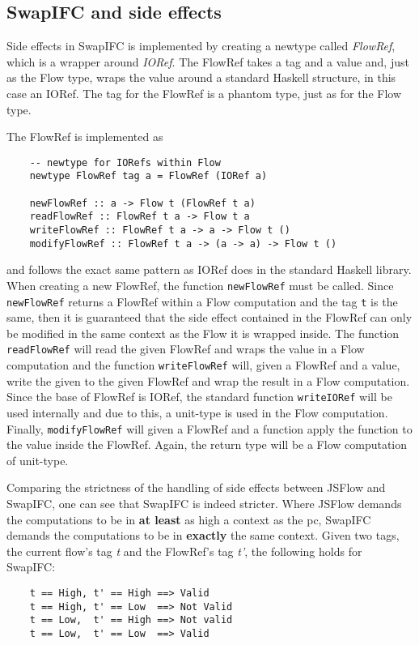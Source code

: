 \subsection{SwapIFC and side effects}
\label{chapter:side-effects-library}
Side effects in SwapIFC is implemented by creating a newtype called \emph{FlowRef}, which is a wrapper around \emph{IORef}. The FlowRef takes a tag and a value and, just as the Flow type, wraps the value around a standard Haskell structure, in this case an IORef. The tag for the FlowRef is a phantom type, just as for the Flow type.

The FlowRef is implemented as
\begin{verbatim}
    -- newtype for IORefs within Flow
    newtype FlowRef tag a = FlowRef (IORef a)

    newFlowRef :: a -> Flow t (FlowRef t a)
    readFlowRef :: FlowRef t a -> Flow t a
    writeFlowRef :: FlowRef t a -> a -> Flow t ()
    modifyFlowRef :: FlowRef t a -> (a -> a) -> Flow t ()
\end{verbatim}
and follows the exact same pattern as IORef does in the standard Haskell library. When creating a new FlowRef, the function {\tt newFlowRef} must be called. Since {\tt newFlowRef} returns a FlowRef within a Flow computation and the tag {\tt t} is the same, then it is guaranteed that the side effect contained in the FlowRef can only be modified in the same context as the Flow it is wrapped inside. The function {\tt readFlowRef} will read the given FlowRef and wraps the value in a Flow computation and the function {\tt writeFlowRef} will, given a FlowRef and a value, write the given to the given FlowRef and wrap the result in a Flow computation. Since the base of FlowRef is IORef, the standard function {\tt writeIORef} will be used internally and due to this, a unit-type is used in the Flow computation. Finally, {\tt modifyFlowRef} will given a FlowRef and a function apply the function to the value inside the FlowRef. Again, the return type will be a Flow computation of unit-type.

Comparing the strictness of the handling of side effects between JSFlow and SwapIFC, one can see that SwapIFC is indeed stricter. Where JSFlow demands the computations to be in \textbf{at least} as high a context as the pc, SwapIFC demands the computations to be in \textbf{exactly} the same context. Given two tags, the current flow's tag \emph{t} and the FlowRef's tag \emph{t'}, the following holds for SwapIFC:
\begin{verbatim}
    t == High, t' == High ==> Valid
    t == High, t' == Low  ==> Not Valid
    t == Low,  t' == High ==> Not valid
    t == Low,  t' == Low  ==> Valid
\end{verbatim}

